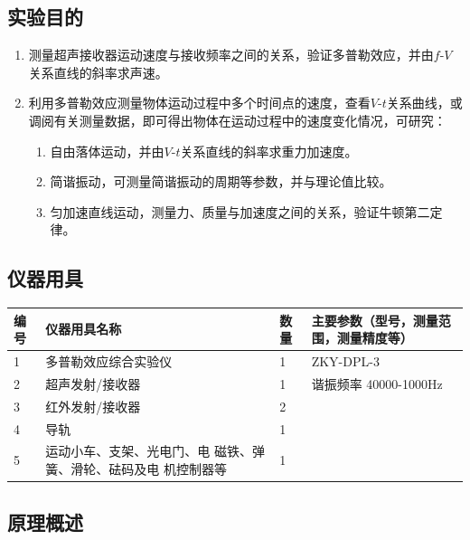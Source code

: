 \documentclass[dvipsnames, svgnames,a4paper,11pt]{article}
\begin{document}
\clearpage

\setcounter{section}{0}
	
\subsection{实验目的}
\begin{enumerate}
	\item 测量超声接收器运动速度与接收频率之间的关系，验证多普勒效应，并由$f$-$V$关系直线的斜率求声速。
	\item 利用多普勒效应测量物体运动过程中多个时间点的速度，查看$V$-$t$关系曲线，或调阅有关测量数据，即可得出物体在运动过程中的速度变化情况，可研究：
	\begin{enumerate}
		\item 自由落体运动，并由$V$-$t$关系直线的斜率求重力加速度。
		\item 简谐振动，可测量简谐振动的周期等参数，并与理论值比较。
		\item 匀加速直线运动，测量力、质量与加速度之间的关系，验证牛顿第二定律。
	\end{enumerate}
\end{enumerate}

\subsection{仪器用具}
\begin{table}[htbp]
	\centering
	\renewcommand\arraystretch{1.6}
	\begin{tabular}{p{}|p{}|p{}|p{}}
	\hline
	编号& 仪器用具名称 & 数量 &  主要参数（型号，测量范围，测量精度等） \\
	\hline
	1 & 多普勒效应综合实验仪 & 1 & ZKY-DPL-3 \\
	2 & 超声发射/接收器 & 1 & 谐振频率 40000-1000Hz \\
	3 & 红外发射/接收器 & 2 & \\
	4 & 导轨 & 1 & \\
	5 & 运动小车、支架、光电门、电
磁铁、弹簧、滑轮、砝码及电
机控制器等 & 1 & \\
	\hline
	\end{tabular}
\end{table}

\subsection{原理概述}
\end{document}
